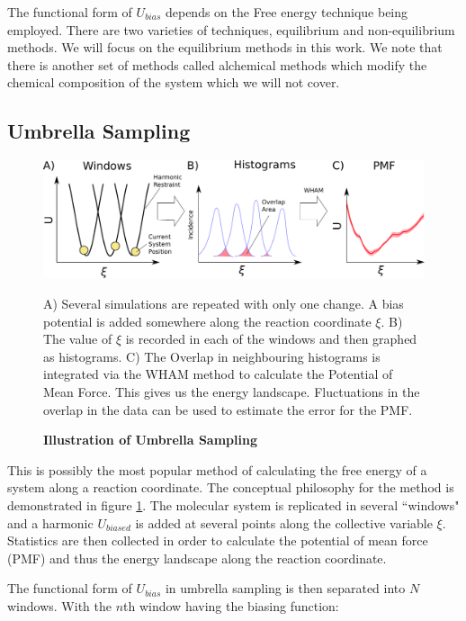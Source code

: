 The functional form of $U_{bias}$ depends on the Free energy technique being employed. There are two varieties of techniques, equilibrium and non-equilibrium methods. We will focus on the equilibrium methods in this work. We note that there is another set of methods called alchemical methods which modify the chemical composition of the system which we will not cover.

\subsection{Umbrella Sampling}
\begin{figure}
	\begin{center}
		\includegraphics[width=\textwidth]{figures/umbrella_sampling.png.pdf}
	\end{center}
	\captionsetup{singlelinecheck = false, justification=raggedright}
	\caption[Illustration of Umbrella Sampling] {\textbf{Illustration of Umbrella Sampling}}{A) Several simulations are repeated with only one change. A bias  potential is added somewhere along the reaction coordinate $\xi$. B) The value of $\xi$ is recorded in each of the windows and then graphed as histograms. C) The Overlap in neighbouring histograms is integrated via the WHAM method to calculate the Potential of Mean Force. This gives us the energy landscape. Fluctuations in the overlap in the data can be used to estimate the error for the PMF. }
	\label{umbrella_sampling_illustration}
\end{figure}

This is possibly the most popular method of calculating the free energy of a system along a reaction coordinate. The conceptual philosophy for the method is demonstrated in figure \ref{umbrella_sampling_illustration}. The molecular system is replicated in several ``windows" and a harmonic $U_{biased}$ is added at several points along the collective variable $\xi$. Statistics are then collected in order to calculate the potential of mean force (PMF) and thus the energy landscape along the reaction coordinate.  

The functional form of $U_{bias}$ in umbrella sampling is then separated into $N$ windows. With the $n$th window having the biasing function:

